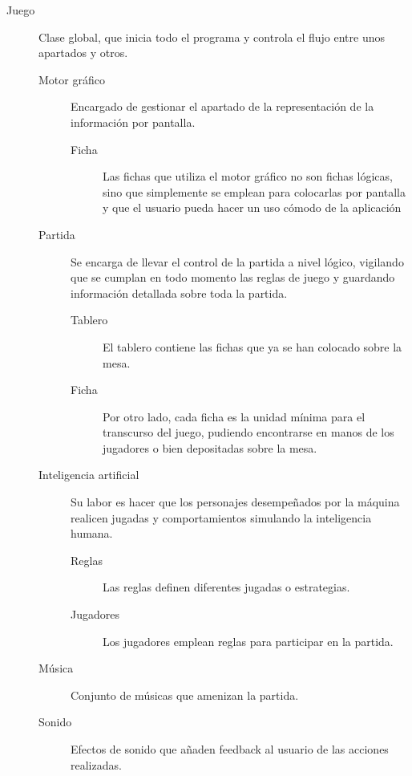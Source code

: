 \begin{description}
    \item[Juego] Clase global, que inicia todo el programa y controla el flujo entre unos apartados y otros.
    \begin{description}
        \item[Motor gráfico] Encargado de gestionar el apartado de la representación de la información por pantalla.
        \begin{description}
            \item[Ficha] Las fichas que utiliza el motor gráfico no son fichas lógicas, sino que simplemente se
                emplean para colocarlas por pantalla y que el usuario pueda hacer un uso cómodo de la aplicación
        \end{description}
        \item[Partida] Se encarga de llevar el control de la partida a nivel lógico, vigilando que se cumplan
                en todo momento las reglas de juego y guardando información detallada sobre toda la partida.
        \begin{description}
            \item[Tablero] El tablero contiene las fichas que ya se han colocado sobre la mesa.
            \item[Ficha] Por otro lado, cada ficha es la unidad mínima para el transcurso del juego, pudiendo
                encontrarse en manos de los jugadores o bien depositadas sobre la mesa.
        \end{description}
        \item[Inteligencia artificial] Su labor es hacer que los personajes desempeñados por la máquina realicen
                jugadas y comportamientos simulando la inteligencia humana.
        \begin{description}
            \item[Reglas] Las reglas definen diferentes jugadas o estrategias.
            \item[Jugadores] Los jugadores emplean reglas para participar en la partida.
        \end{description}
        \item[Música] Conjunto de músicas que amenizan la partida.
        \item[Sonido] Efectos de sonido que añaden feedback al usuario de las acciones realizadas.
    \end{description}
\end{description}

